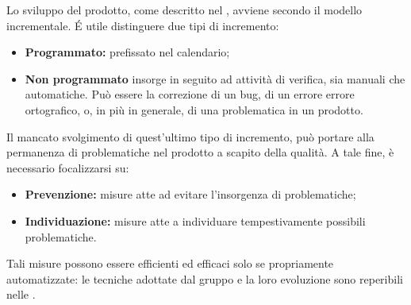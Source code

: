 Lo sviluppo del prodotto, come descritto nel \PdP , avviene secondo il {modello incrementale}. \'E utile distinguere due tipi di incremento:
\begin{itemize}
	\item \textbf{Programmato:} prefissato nel calendario;
	\item \textbf{Non programmato} insorge in seguito ad attività di verifica, sia manuali che automatiche. Può essere la correzione di un {bug}, di un errore errore ortografico, o, in più in generale, di una problematica in un prodotto.
\end{itemize}
Il mancato svolgimento di quest'ultimo tipo di incremento, può portare alla permanenza di problematiche nel prodotto a scapito della qualità. A tale fine, è necessario focalizzarsi su:
\begin{itemize}
	\item \textbf{Prevenzione:} misure atte ad evitare l'insorgenza di problematiche;
	\item \textbf{Individuazione:} misure atte a individuare tempestivamente possibili problematiche.
\end{itemize}
Tali misure possono essere {efficienti} ed {efficaci} solo se propriamente automatizzate: le tecniche adottate dal gruppo \gruppo \space e la loro evoluzione sono reperibili nelle \NdP . 
 
